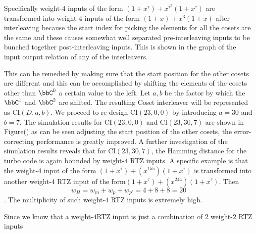 \documentclass[11pt, oneside, dvipdfmx]{book}
\begin{document}
Specifically weight-$4$ inputs of the form $(1+x^{\tau}) +x^{\tau^2}(1+x^{\tau})$ are transformed into weight-$4$ inputs of the form $(1+x)+x^3(1+x)$ after interleaving because the start index for picking the elements for all the cosets are the same and these causes somewhat well separated pre-interleaving inputs to be bunched together post-interleaving inputs. This is shown in the graph of the input output relation of any of the interleavers.

This can be remedied by making sure that the start position for the other cosets are different and this can be accomplished by shifting the elements of the cosets other than $\bbC^0$ a certain value to the left. Let $a,b$ be the factor by which the $\bbC^1$ and $\bbC^2$ are shifted. The resulting Coset interleaver will be represented as CI$(D,a,b)$. We proceed to re-design  CI$(23,0,0)$  by introducing $a=30$ and $b=7$.
The simulation results for CI$(23,0,0)$ and CI$(23,30,7)$ are shown in Figure() as can be seen adjusting the start position of the other cosets, the error-correcting performance is greatly improved. A further investigation of the simulation results reveals that for CI$(23,30,7)$, the Hamming distance for the turbo code is again bounded by weight-$4$ RTZ inputs. A specific example is that the weight-$4$ input of the form $(1+x^{\tau})+(x^{155})(1+x^{\tau})$ is transformed into another weight-$4$ RTZ input of the form$ (1+x^{\tau})+(x^{244})(1+x^{\tau})$. Then $$w_H=w_m+w_p+w_{p'}=4+8+8=20$$. The multiplicity of such weight-$4$ RTZ inputs is extremely high. 

Since we know that a weight-$4$RTZ input is just a combination of 2 weight-$2$ RTZ inputs 

 
\end{document}
